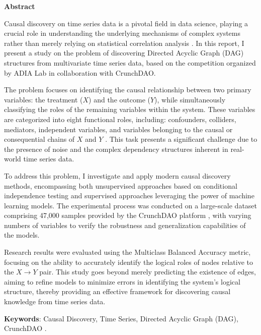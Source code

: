 \begin{center}
\textbf{\large{Abstract}	}
\end{center}


\begin{small}

Causal discovery on time series data is a pivotal field in data science, playing a crucial role in understanding the underlying mechanisms of complex systems rather than merely relying on statistical correlation analysis \cite{crunchdao_causal_2024}. In this report, I present a study on the problem of discovering Directed Acyclic Graph (DAG) structures from multivariate time series data, based on the competition organized by ADIA Lab in collaboration with CrunchDAO.

The problem focuses on identifying the causal relationship between two primary variables: the treatment ($X$) and the outcome ($Y$), while simultaneously classifying the roles of the remaining variables within the system. These variables are categorized into eight functional roles, including: confounders, colliders, mediators, independent variables, and variables belonging to the causal or consequential chains of $X$ and $Y$ \cite{crunchdao_causal_2024}. This task presents a significant challenge due to the presence of noise and the complex dependency structures inherent in real-world time series data.

To address this problem, I investigate and apply modern causal discovery methods, encompassing both unsupervised approaches based on conditional independence testing and supervised approaches leveraging the power of machine learning models. The experimental process was conducted on a large-scale dataset comprising 47,000 samples provided by the CrunchDAO platform \cite{crunchdao_causal_2024}, with varying numbers of variables to verify the robustness and generalization capabilities of the models.

Research results were evaluated using the Multiclass Balanced Accuracy metric, focusing on the ability to accurately identify the logical roles of nodes relative to the $X \rightarrow Y$ pair. This study goes beyond merely predicting the existence of edges, aiming to refine models to minimize errors in identifying the system's logical structure, thereby providing an effective framework for discovering causal knowledge from time series data.

\vspace*{1cm}
\textbf{Keywords}: Causal Discovery, Time Series, Directed Acyclic Graph (DAG), CrunchDAO \cite{crunchdao_causal_2024}.

\end{small}
